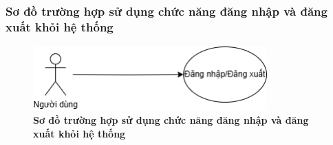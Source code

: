 \subsubsection{Sơ đồ trường hợp sử dụng chức năng đăng nhập và đăng xuất khỏi hệ thống}

\begin{figure}[H]
	\centering
	\includegraphics[width=9cm,height=2.5cm]{Images/use_case/use_case_login_logout.png}
	\caption[Sơ đồ trường hợp sử dụng chức năng đăng nhập và đăng xuất khỏi hệ thống]{\bfseries \fontsize{12pt}{0pt}
		\selectfont Sơ đồ trường hợp sử dụng chức năng đăng nhập và đăng xuất khỏi hệ thống}
	\label{use_case_login_logout} %
\end{figure}

